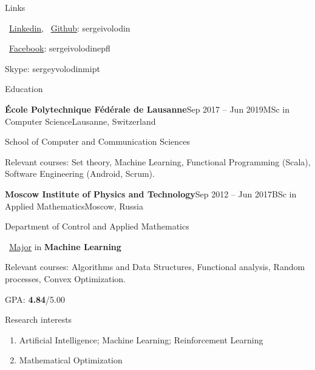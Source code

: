 \documentclass{resume} %
\begin{document}
\begin{rSection}{Links}
\item \faExternalLink~\href{http://linkedin.com/in/sergeivolodin/}{Linkedin}, \faExternalLink~\href{github.com/sergeivolodin}{Github}: sergeivolodin
\item \faExternalLink~\href{https://www.facebook.com/sergeivolodinepfl}{Facebook}: sergeivolodinepfl
\item Skype: sergeyvolodinmipt
\end{rSection}

\begin{rSection}{Education}
\begin{rSubsection}{\bf \'Ecole Polytechnique F\'ed\'erale de Lausanne}{Sep 2017 -- Jun 2019}{MSc in Computer Science}{Lausanne, Switzerland}
\item School of Computer and Communication Sciences
\item Relevant courses: Set theory, Machine Learning, Functional Programming (Scala), Software Engineering (Android, Scrum).
\end{rSubsection}

\begin{rSubsection}{\bf Moscow Institute of Physics and Technology}{Sep 2012 -- Jun 2017}{BSc in Applied Mathematics}{Moscow, Russia}
\item Department of Control and Applied Mathematics
\item \faExternalLink~\href{http://www.machinelearning.ru/}{Major} in {\bf Machine Learning}
\item Relevant courses: Algorithms and Data Structures, Functional analysis, Random processes, Convex Optimization.
\item GPA: {\bf 4.84}/5.00
\end{rSubsection}
\end{rSection}

\begin{rSection}{Research interests}
\begin{enumerate}
\item Artificial Intelligence; Machine Learning; Reinforcement Learning
\item Mathematical Optimization
\end{enumerate}
\end{rSection}
\end{document}

